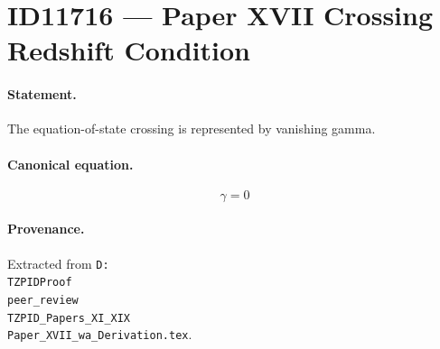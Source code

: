 \section*{ID11716 --- Paper XVII Crossing Redshift Condition}

\paragraph{Statement.}
The equation-of-state crossing is represented by vanishing gamma.

\paragraph{Canonical equation.}
\[
\gamma=0
\]

\paragraph{Provenance.}
Extracted from \texttt{D:\\TZPIDProof\\peer\_review\\TZPID\_Papers\_XI\_XIX\\Paper\_XVII\_wa\_Derivation.tex}.
